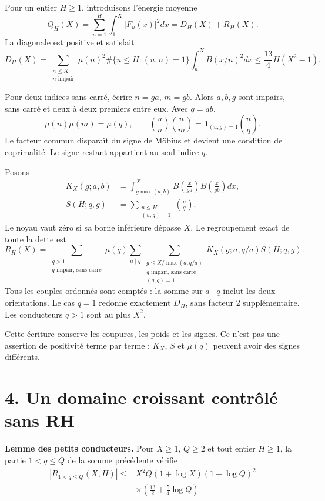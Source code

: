 \documentclass[
  11pt,
  a4paper,
]{article}
\begin{document}
Pour un entier \(H\ge1\), introduisons l'énergie moyenne \[
Q_H(X)=\sum_{u=1}^H\int_1^X|F_u(x)|^2dx=D_H(X)+R_H(X).
\] La diagonale est positive et satisfait \[
D_H(X)=\sum_{\substack{n\le X\\n\text{ impair}}}\mu(n)^2
\#\{u\le H:(u,n)=1\}\int_n^XB(x/n)^2dx
\le\frac{13}{4}H(X^2-1).
\]

Pour deux indices sans carré, écrire \(n=ga\), \(m=gb\). Alors \(a,b,g\)
sont impairs, sans carré et deux à deux premiers entre eux. Avec
\(q=ab\), \[
\mu(n)\mu(m)=\mu(q),\qquad
\left(\frac un\right)\left(\frac um\right)
=\mathbf1_{(u,g)=1}\left(\frac uq\right).
\] Le facteur commun disparaît du signe de Möbius et devient une
condition de coprimalité. Le signe restant appartient au seul indice
\(q\).

Posons \[
\begin{aligned}
K_X(g;a,b)&=\int_{g\max(a,b)}^X
B\!\left(\frac{x}{ga}\right)B\!\left(\frac{x}{gb}\right)dx,\\
S(H;q,g)&=\sum_{\substack{u\le H\\(u,g)=1}}\left(\frac uq\right).
\end{aligned}
\] Le noyau vaut zéro si sa borne inférieure dépasse \(X\). Le
regroupement exact de toute la dette est \[
\boxed{
R_H(X)=\sum_{\substack{q>1\\q\text{ impair, sans carré}}}\mu(q)
\sum_{a\mid q}
\sum_{\substack{g\le X/\max(a,q/a)\\
g\text{ impair, sans carré}\\(g,q)=1}}
K_X(g;a,q/a)S(H;q,g).}
\] Tous les couples ordonnés sont comptés : la somme sur \(a\mid q\)
inclut les deux orientations. Le cas \(q=1\) redonne exactement \(D_H\),
sans facteur 2 supplémentaire. Les conducteurs \(q>1\) sont au plus
\(X^2\).

Cette écriture conserve les coupures, les poids et les signes. Ce n'est
pas une assertion de positivité terme par terme : \(K_X\), \(S\) et
\(\mu(q)\) peuvent avoir des signes différents.

\newpage

\hypertarget{un-domaine-croissant-contruxf4luxe9-sans-rh}{%
\section{4. Un domaine croissant contrôlé sans
RH}\label{un-domaine-croissant-contruxf4luxe9-sans-rh}}

\textbf{Lemme des petits conducteurs.} Pour \(X\ge1\), \(Q\ge2\) et tout
entier \(H\ge1\), la partie \(1<q\le Q\) de la somme précédente vérifie
\[
\boxed{\begin{aligned}
|R_{1<q\le Q}(X,H)|\le{}&X^2Q(1+\log X)(1+\log Q)^2\\
&\times\left(\frac{13}{2}+\frac54\log Q\right).
\end{aligned}}
\]
\end{document}
